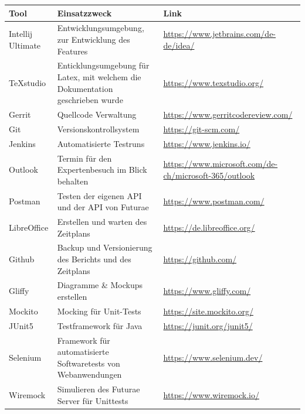 \renewcommand{\arraystretch}{1.5}
\begin{longtable}{|p{}|p{}|p{}|}
    \hline
    \textbf{Tool} & \textbf{Einsatzzweck} & \textbf{Link} \\ \hline
    Intellij Ultimate           & Entwicklungsumgebung, zur Entwicklung des Features                   & \url{https://www.jetbrains.com/de-de/idea/}     \\ \hline
    TeXstudio           & Enticklungsumgebung für Latex, mit welchem die Dokumentation geschrieben wurde & \url{https://www.texstudio.org/}     \\ \hline
    Gerrit           & Quellcode Verwaltung & \url{https://www.gerritcodereview.com/}     \\ \hline
    Git          & Versionskontrollsystem & \url{https://git-scm.com/}     \\ \hline
    Jenkins & Automatisierte Testruns  & \url{https://www.jenkins.io/}     \\ \hline
    Outlook & Termin für den Expertenbesuch im Blick behalten& \url{https://www.microsoft.com/de-ch/microsoft-365/outlook} \\ \hline
    Postman & Testen der eigenen API und der API von Futurae & \url{https://www.postman.com/} \\ \hline
    LibreOffice & Erstellen und warten des Zeitplans & \url{https://de.libreoffice.org/} \\ \hline
    Github & Backup und Versionierung des Berichts und des Zeitplans & \url{https://github.com/} \\ \hline
    Gliffy & Diagramme \& Mockups erstellen & \url{https://www.gliffy.com/} \\ \hline
    Mockito & Mocking für Unit-Tests& \url{https://site.mockito.org/} \\ \hline
    JUnit5 & Testframework für Java & \url{https://junit.org/junit5/} \\ \hline
    Selenium & Framework für automatisierte Softwaretests von Webanwendungen  & \url{https://www.selenium.dev/} \\ \hline
    Wiremock & Simulieren des Futurae Server für Unittests & \url{https://www.wiremock.io/} \\ \hline    
\end{longtable}
\renewcommand{\arraystretch}{1}
\newpage